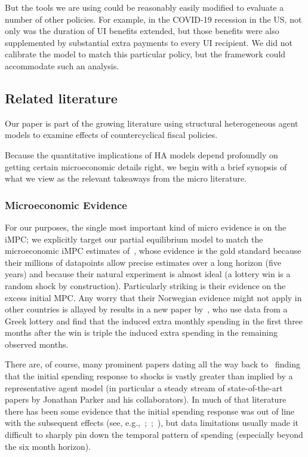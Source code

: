 \documentclass[qe]{econsocart}
\begin{document}
But the tools we are using could be reasonably easily modified to evaluate a number of other policies.  For example, in the COVID-19 recession in the US, not only was the duration of UI benefits extended, but those benefits were also supplemented by substantial extra payments to every UI recipient.  We did not calibrate the model to match this particular policy, but the framework could accommodate such an analysis.

\label{microeconomic-literature}\par\subsection{Related literature}
\label{sec:microlit} 

Our paper is part of the growing literature using structural heterogeneous agent models to examine effects of countercyclical fiscal policies.

Because the quantitative implications of HA models depend profoundly on getting certain microeconomic details right, we begin with a brief synopsis of what we view as the relevant takeaways from the micro literature.

\label{microeconomic-evidence}
\subsubsection{Microeconomic Evidence}
For our purposes, the single most important kind of micro evidence is on the iMPC; we explicitly target our partial equilibrium model to match the microeconomic iMPC estimates of~\cite{fagereng-mpc-2021}, whose evidence is the gold standard because their millions of datapoints allow precise estimates over a long horizon (five years) and because their natural experiment is almost ideal (a lottery win is a random shock by construction).  Particularly striking is their evidence on the excess initial MPC.  Any worry that their Norwegian evidence might not apply in other countries is allayed by results in a new paper by~\cite{kotsogiannisMPCs}, who use data from a Greek lottery and find that the induced extra monthly spending in the first three months after the win is triple the induced extra spending in the remaining observed months.

There are, of course, many prominent papers dating all the way back to~\cite{friedmanWindfalls} finding that the initial spending response to shocks is vastly greater than implied by a representative agent model (in particular a steady stream of state-of-the-art papers by Jonathan Parker and his collaborators). In much of that literature there has been some evidence that the initial spending response was out of line with the subsequent effects (see, e.g.,~\cite{parker2013consumer};~\cite{broda2014economic};~\cite{jpsTax}), but data limitations usually made it difficult to sharply pin down the temporal pattern of spending (especially beyond the six month horizon).
\end{document}
